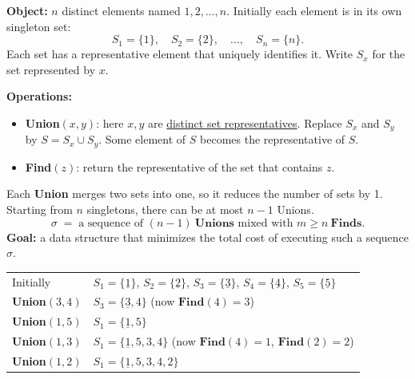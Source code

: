 \documentclass[11pt]{article}
\begin{document}
\begin{defbox}
\textbf{Object:} $n$ distinct elements named $1, 2, \ldots, n$. Initially each element is in its own \textcolor{rustW}{singleton set}:
\[
  S_1 = \{1\},\quad S_2 = \{2\},\quad \ldots,\quad S_n = \{n\}.
\]
Each set has a \textcolor{rustW}{representative} element that uniquely identifies it. Write $S_x$ for the set represented by $x$.

\textbf{Operations:}
\begin{itemize}[leftmargin=1.4em,itemsep=1pt]
  \item \textbf{Union}$(x,y)$: here $x, y$ are \underline{distinct set representatives}. Replace $S_x$ and $S_y$ by $S = S_x \cup S_y$. Some element of $S$ becomes the representative of $S$.
  \item \textbf{Find}$(z)$: return the representative of the set that contains $z$.
\end{itemize}
\end{defbox}

\begin{keybox}
Each \textbf{Union} merges two sets into one, so it \textcolor{rustW}{reduces the number of sets by 1}. Starting from $n$ singletons, there can be \textcolor{rustW}{at most $n-1$ Unions}.
\[
  \sigma \;=\; \text{a sequence of } (n-1)\ \textbf{Unions} \text{ mixed with } m \ge n\ \textbf{Finds}.
\]
\textbf{Goal:} a data structure that minimizes the \textcolor{rustW}{total cost} of executing such a sequence $\sigma$.
\end{keybox}

\begin{examplebox}[Tracing the operations ($S_j$ = set represented by $j$)]
\renewcommand{\arraystretch}{1.3}
\begin{tabular}{l l}
Initially & $S_1{=}\{\underline{1}\}$, \; $S_2{=}\{\underline{2}\}$, \; $S_3{=}\{\underline{3}\}$, \; $S_4{=}\{\underline{4}\}$, \; $S_5{=}\{\underline{5}\}$\\
\textbf{Union}$(3,4)$ & $S_3 = \{\underline{3},4\}$ \quad (now $\mathbf{Find}(4)=3$)\\
\textbf{Union}$(1,5)$ & $S_1 = \{\underline{1},5\}$\\
\textbf{Union}$(1,3)$ & $S_1 = \{\underline{1},5,3,4\}$ \quad (now $\mathbf{Find}(4)=1$, \; $\mathbf{Find}(2)=2$)\\
\textbf{Union}$(1,2)$ & $S_1 = \{\underline{1},5,3,4,2\}$\\
\end{tabular}
\end{examplebox}
\end{document}
